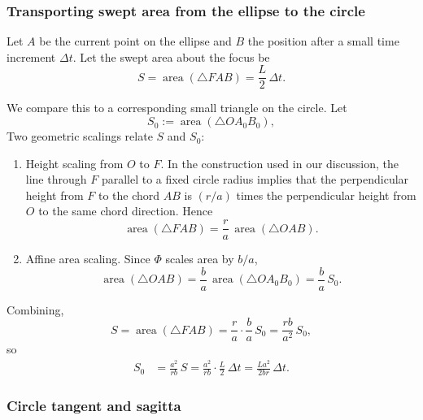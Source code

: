 \subsubsection{Transporting swept area from the ellipse to the circle}
\label{sec:transport-and-sagitta}

Let $A$ be the current point on the ellipse and $B$ the position after a small time increment $\Delta t$. Let the swept area about the focus be
\begin{equation}
  S = \operatorname{area}(\triangle F A B)=\frac{L}{2}\,\Delta t.
\end{equation}

We compare this to a corresponding small triangle on the circle. Let
\begin{equation}
  S_0 := \operatorname{area}(\triangle O A_0 B_0),
\end{equation}
Two geometric scalings relate $S$ and $S_0$:
\begin{enumerate}
  \item Height scaling from $O$ to $F$. In the construction used in our discussion, the line through $F$ parallel to a fixed circle radius implies that the perpendicular height from $F$ to the chord $AB$ is $(r/a)$ times the perpendicular height from $O$ to the same chord direction. Hence
    \begin{equation}
      \operatorname{area}(\triangle F A B)=\frac{r}{a}\,\operatorname{area}(\triangle O A B).
    \end{equation}

  \item Affine area scaling. Since $\Phi$ scales area by $b/a$,
    \begin{equation}
      \operatorname{area}(\triangle O A B)=\frac{b}{a}\,\operatorname{area}(\triangle O A_0 B_0)=\frac{b}{a}\,S_0.
    \end{equation}
\end{enumerate}

Combining,
\begin{equation}
  S=\operatorname{area}(\triangle F A B)=\frac{r}{a}\cdot\frac{b}{a}\,S_0=\frac{rb}{a^2}\,S_0,
\end{equation}
so
\begin{align}
  S_0 &= \frac{a^2}{rb}\,S \label{eq:s0-from-area}
  = \frac{a^2}{rb}\cdot \frac{L}{2}\,\Delta t
  = \frac{L a^2}{2 b r}\,\Delta t.
\end{align}

\subsubsection{Circle tangent and sagitta}
\label{subsec:sagitta}

